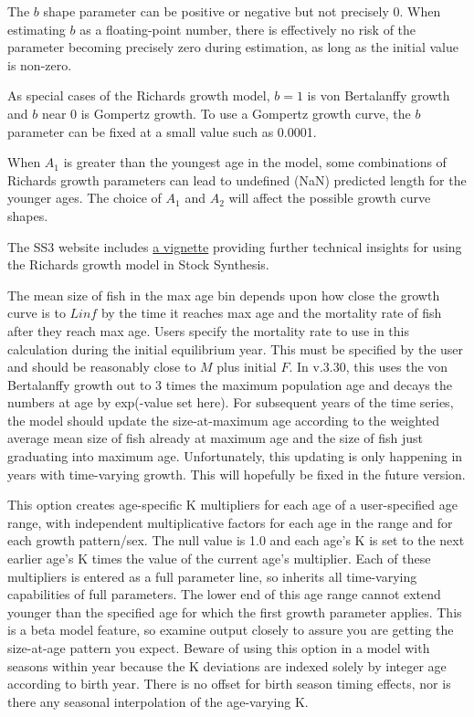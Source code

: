 The $b$ shape parameter can be positive or negative but not precisely 0. When estimating $b$ as a floating-point number, there is effectively no risk of the parameter becoming precisely zero during estimation, as long as the initial value is non-zero.

As special cases of the Richards growth model, $b\!=\!1$ is von Bertalanffy growth and $b$ near 0 is Gompertz growth. To use a Gompertz growth curve, the $b$ parameter can be fixed at a small value such as 0.0001.

When $A_1$ is greater than the youngest age in the model, some combinations of Richards growth parameters can lead to undefined (NaN) predicted length for the younger ages. The choice of $A_1$ and $A_2$ will affect the possible growth curve shapes.

The SS3 website includes \href{https://nmfs-ost.github.io/ss3-website/qmds/richards_growth_curve.html}{a vignette} providing further technical insights for using the Richards growth model in Stock Synthesis.

	
The mean size of fish in the max age bin depends upon how close the growth curve is to $Linf$ by the time it reaches max age and the mortality rate of fish after they reach max age. Users specify the mortality rate to use in this calculation during the initial equilibrium year. This must be specified by the user and should be reasonably close to $M$ plus initial $F$. In v.3.30, this uses the von Bertalanffy growth out to 3 times the maximum population age and decays the numbers at age by exp(-value set here). For subsequent years of the time series, the model should update the size-at-maximum age according to the weighted average mean size of fish already at maximum age and the size of fish just graduating into maximum age. Unfortunately, this updating is only happening in years with time-varying growth. This will hopefully be fixed in the future version.
	
This option creates age-specific K multipliers for each age of a user-specified age range, with independent multiplicative factors for each age in the range and for each growth pattern/sex. The null value is 1.0 and each age's K is set to the next earlier age's K times the value of the current age's multiplier. Each of these multipliers is entered as a full parameter line, so inherits all time-varying capabilities of full parameters. The lower end of this age range cannot extend younger than the specified age for which the first growth parameter applies. This is a beta model feature, so examine output closely to assure you are getting the size-at-age pattern you expect. Beware of using this option in a model with seasons within year because the K deviations are indexed solely by integer age according to birth year. There is no offset for birth season timing effects, nor is there any seasonal interpolation of the age-varying K.

